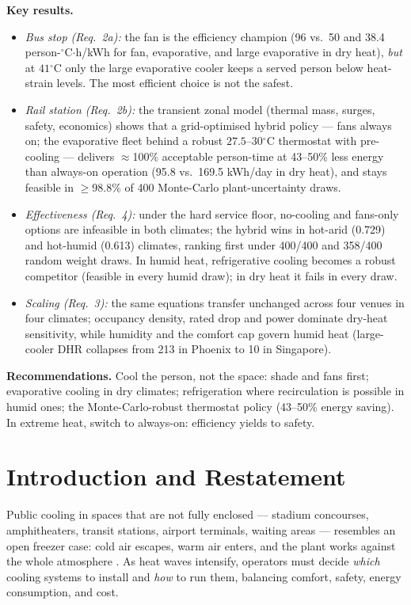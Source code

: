 \documentclass[11pt]{article}
\newcommand{\degrees}{\ensuremath{^\circ}}
\newcommand{\DHR}{\text{DHR}}
\begin{document}
\noindent\textbf{Key results.}
\begin{itemize}
\item \textit{Bus stop (Req.~2a):} the fan is the efficiency champion (96 vs.\ 50 and 38.4 person-$\degrees$C$\cdot$h/kWh for fan, evaporative, and large evaporative in dry heat), \emph{but} at $41\degrees$C only the large evaporative cooler keeps a served person below heat-strain levels. The most efficient choice is not the safest.
\item \textit{Rail station (Req.~2b):} the transient zonal model (thermal mass, surges, safety, economics) shows that a grid-optimised hybrid policy --- fans always on; the evaporative fleet behind a robust $27.5$--$30\degrees$C thermostat with pre-cooling --- delivers $\approx$100\% acceptable person-time at 43--50\% less energy than always-on operation (95.8 vs.\ 169.5 kWh/day in dry heat), and stays feasible in $\geq$98.8\% of 400 Monte-Carlo plant-uncertainty draws.
\item \textit{Effectiveness (Req.~4):} under the hard service floor, no-cooling and fans-only options are infeasible in both climates; the hybrid wins in hot-arid (0.729) and hot-humid (0.613) climates, ranking first under 400/400 and 358/400 random weight draws. In humid heat, refrigerative cooling becomes a robust competitor (feasible in every humid draw); in dry heat it fails in every draw.
\item \textit{Scaling (Req.~3):} the same equations transfer unchanged across four venues in four climates; occupancy density, rated drop and power dominate dry-heat sensitivity, while humidity and the comfort cap govern humid heat (large-cooler $\DHR$ collapses from 213 in Phoenix to 10 in Singapore).
\end{itemize}

\noindent\textbf{Recommendations.} Cool the person, not the space: shade and fans first; evaporative cooling in dry climates; refrigeration where recirculation is possible in humid ones; the Monte-Carlo-robust thermostat policy (43--50\% energy saving). In extreme heat, switch to always-on: efficiency yields to safety.

\newpage
\tableofcontents
\newpage
\section{Introduction and Restatement}
Public cooling in spaces that are not fully enclosed --- stadium concourses, amphitheaters, transit stations, airport terminals, waiting areas --- resembles an open freezer case: cold air escapes, warm air enters, and the plant works against the whole atmosphere \cite{comap}. As heat waves intensify, operators must decide \emph{which} cooling systems to install and \emph{how} to run them, balancing comfort, safety, energy consumption, and cost.
\end{document}
